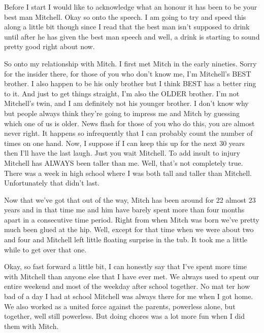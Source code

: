 Before I start I would like to acknowledge what an honour it has been to be your best man Mitchell. Okay so onto the speech. I am going to try and speed this along a little bit though since I read that the best man isn't supposed to drink until after he has given the best man speech and well, a drink is starting to sound pretty good right about now.

So onto my relationship with Mitch. I first met Mitch in the early nineties. Sorry for the insider there, for those of you who don't know me, I’m Mitchell’s BEST brother. I also happen to be his only brother but I think BEST has a better ring to it. And just to get things straight, I'm also the OLDER brother. I’m not Mitchell’s twin, and I am definitely not his younger brother. I don't know why but people always think they're going to impress me and Mitch by guessing which one of us is older. News flash for those of you who do this, you are almost never right. It happens so infrequently that I can probably count the number of times on one hand. Now, I suppose if I can keep this up for the next 30 years then I'll have the last laugh. Just you wait Mitchell. To add insult to injury Mitchell has ALWAYS been taller than me. Well, that's not completely true. There was a week in high school where I was both tall and taller than Mitchell. Unfortunately that didn't last.

Now that we've got that out of the way, Mitch has been around for 22 almost 23 years and in that time me and him have barely spent more than four months apart in a consecutive time period.
Right from when Mitch was born we've pretty much been glued at the hip. Well, except for that time when we were about two and four and Mitchell left little floating surprise in the tub. It took me a little while to get over that one.

Okay, so fast forward a little bit, I can honestly say that I've spent more time with Mitchell than anyone else that I have ever met. We always used to spent our entire weekend and most of the weekday after school together. No mat
ter how bad of a day I had at school Mitchell was always there for me when I got home. We also worked as a united force against the parents, powerless alone, but together, well still powerless. But doing chores was a lot more fun when I did them with Mitch.

